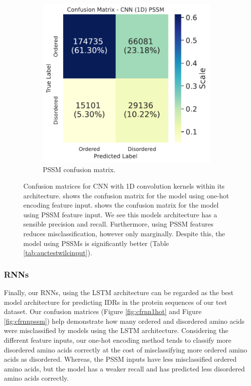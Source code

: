 \documentclass{l4proj}
\begin{document}
\begin{figure}[!htb]
\begin{subfigure}[b]{0.48\textwidth}
        \includegraphics[width=\textwidth]{images/confmats/CNN1Dpssm-cf.pdf}
        \caption{PSSM confusion matrix.}
        \label{fig:cf1dpssm}
    \end{subfigure}
    \caption{Confusion matrices for CNN with 1D convolution kernels within its architecture.  shows the confusion matrix for the model using one-hot encoding feature input.  shows the confusion matrix for the model using PSSM feature input. We see this models architecture has a sensible precision and recall. Furthermore, using PSSM features reduces misclassification, however only marginally. Despite this, the model using PSSMs is significantly better (Table \ref{tab:auctestwilcinput}).}
    \label{fig:cf1d}
\end{figure}

\subsubsection{RNNs \newline}
Finally, our RNNs, using the LSTM architecture can be regarded as the best model architecture for predicting IDRs in the protein sequences of our test dataset. Our confusion matrices (Figure \ref{fig:cfrnn1hot} and Figure \ref{fig:cfrnnpssm}) help demonstrate how many ordered and disordered amino acids were misclassified by models using the LSTM architecture. Considering the different feature inputs, our one-hot encoding method tends to classify more disordered amino acids correctly at the cost of misclassifying more ordered amino acids as disordered. Whereas, the PSSM inputs have less misclassified ordered amino acids, but the model has a weaker recall and has predicted less disordered amino acids correctly.
\end{document}

